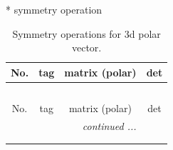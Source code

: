 \documentclass[fleqn,8pt]{jsarticle}
\begin{document}
* symmetry operation
\renewcommand{\arraystretch}{1.3}
\begin{longtable}{cccc}
\caption{Symmetry operations for 3d polar vector.}
 \\
 \hline \hline
No. & tag & matrix (polar) & det \\ \hline \endfirsthead

\multicolumn{3}{l}{\tablename\ \thetable{}} \\
 \hline \hline
No. & tag & matrix (polar) & det \\ \hline \endhead

 \hline \hline
\multicolumn{3}{r}{\footnotesize\it continued ...} \\ \endfoot

 \hline \hline
\multicolumn{3}{r}{} \\ \endlastfoot


\end{longtable}
\end{document}
